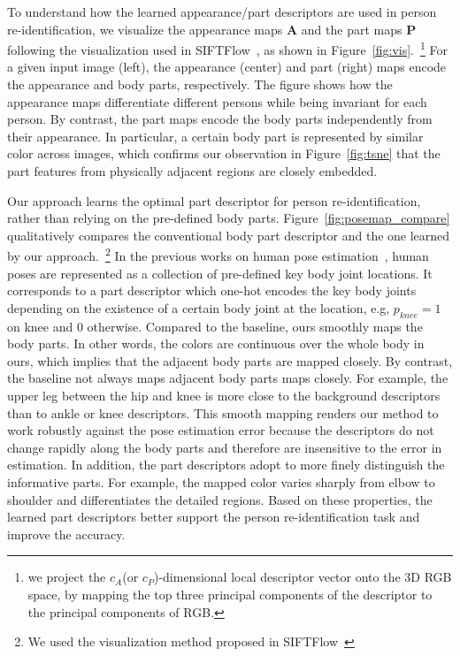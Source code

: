 \documentclass{llncs}
\begin{document}
To understand how the learned appearance/part descriptors are used in person re-identification, we visualize the appearance maps $\mathbf{A}$ and the part maps $\mathbf{P}$ following the visualization used in SIFTFlow~\cite{siftflow}, as shown in Figure~\ref{fig:vis}.~\footnote{we project the $c_A$(or $c_P$)-dimensional local descriptor vector onto the 3D RGB space, by mapping the top three principal components of the descriptor to the principal components of RGB.} For a given input image (left), the appearance (center) and part (right) maps encode the appearance and body parts, respectively. The figure shows how the appearance maps differentiate different persons while being invariant for each person.
By contrast, the part maps encode the body parts independently from their appearance. In particular, a certain body part is represented by similar color across images, which confirms our observation in Figure~\ref{fig:tsne} that the part features from physically adjacent regions are closely embedded.

Our approach learns the optimal part descriptor for person re-identification, rather than relying on the pre-defined body parts. Figure~\ref{fig:posemap_compare} qualitatively compares the conventional body part descriptor and the one learned by our approach.~\footnote{We used the visualization method proposed in SIFTFlow~\cite{siftflow}} In the previous works on human pose estimation~\cite{conf/cvpr/wei16,conf/cvpr/cao17,hourglass}, human poses are represented as a collection of pre-defined key body joint locations. It corresponds to a part descriptor which one-hot encodes the key body joints depending on the existence of a certain body joint at the location, e.g, $p_{knee}=1$ on knee and $0$ otherwise. 
Compared to the baseline, ours smoothly maps the body parts. In other words, the colors are continuous over the whole body in ours, which implies that the adjacent body parts are mapped closely. By contrast, the baseline not always maps adjacent body parts maps closely.  For example, the upper leg between the hip and knee is more close to the background descriptors than to ankle or knee descriptors. This smooth mapping renders our method to work robustly against the pose estimation error because the descriptors do not change rapidly along the body parts and therefore are insensitive to the error in estimation. In addition, the part descriptors adopt to more finely distinguish the informative parts. For example, the mapped color varies sharply from elbow to shoulder and differentiates the detailed regions. Based on these properties, the learned part descriptors better support the person re-identification task and improve the accuracy.
\end{document}
